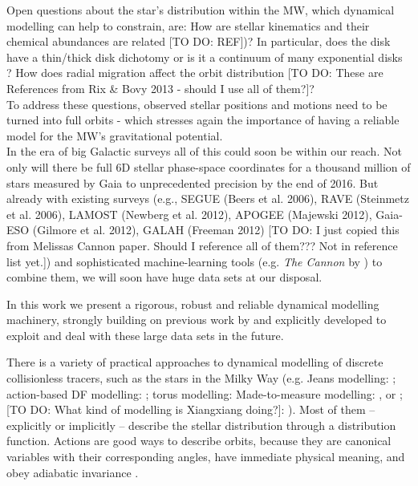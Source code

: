 Open questions about the star's distribution within the MW, which dynamical modelling can help to constrain, are: How are stellar kinematics and their chemical abundances are related \citep{san15} [TO DO: REF])? In particular, does the disk have a thin/thick disk dichotomy \citep{gil83} or is it a continuum of many exponential disks \citep{bov12d}? How does radial migration affect the orbit distribution \citep{sel02,ros08a,ros08b,sch08,2011A&A...527A.147M} [TO DO: These are References from Rix \& Bovy 2013 - should I use all of them?]?\\
To address these questions, observed stellar positions and motions need to be turned into full orbits - which stresses again the importance of having a reliable model for the MW's gravitational potential. \\

In the era of big Galactic surveys all of this could soon be within our reach. Not only will there be full 6D stellar phase-space coordinates for a thousand million of stars measured by Gaia \citep{2001A&A...369..339P} to unprecedented precision by the end of 2016. But already with existing surveys (e.g., SEGUE (Beers et al. 2006), RAVE (Steinmetz et al. 2006), LAMOST (Newberg et al. 2012), APOGEE (Majewski 2012), Gaia-ESO (Gilmore et al. 2012), GALAH (Freeman 2012) [TO DO: I just copied this from Melissas Cannon paper. Should I reference all of them??? Not in reference list yet.]) and sophisticated machine-learning tools (e.g. \emph{The Cannon} by \citet{nes15}) to combine them, we will soon have huge data sets at our disposal.

In this work we present a rigorous, robust and reliable dynamical modelling machinery, strongly building on previous work by \citet{bin11,bin12,bov13,bov15} and explicitly developed to exploit and deal with these large data sets in the future.

There is a variety of practical approaches to dynamical modelling of discrete collisionless tracers, such as the stars in the Milky Way (e.g. Jeans modelling: \citet{bue15, loe12}; action-based DF modelling: \citet{bov13,pif14,san15}; torus modelling: Made-to-measure modelling: \citet{2012MNRAS.419.2251M,2013MNRAS.433.1411M}, \citet{lor07,sye96,bis04} or \citet{hun14}; [TO DO: What kind of modelling is Xiangxiang doing?]: \citet{2015arXiv150606144X}). Most of them -- explicitly or implicitly -- describe the stellar distribution through a distribution function.  Actions are good ways to describe orbits, because they are canonical variables with their corresponding angles, have immediate physical meaning, and obey adiabatic invariance \citep{bin08,2008MNRAS.390..429M,bin10,bin11,bin11b}.\\


